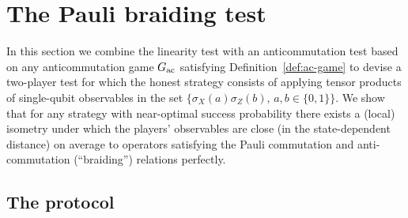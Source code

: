 \documentclass[11pt,letterpaper]{article}
\newcommand{\<}{\langle}
\renewcommand{\>}{\rangle}
\newcommand{\ac}{{\ensuremath{\rm ac}}}
\begin{document}
\section{The Pauli braiding test}
\label{sec:twoprover}


In this section we combine the linearity test with an anticommutation test based on any anticommutation game $G_\ac$ satisfying Definition~\ref{def:ac-game} to devise a
two-player test for which the honest strategy consists of applying
tensor products of single-qubit observables in the set $\{\sigma_X(a)\sigma_Z(b),\,a,b\in\{0,1\}\}$. We show that for any strategy with
near-optimal success probability there exists a (local) isometry under which
the players' observables are close (in the state-dependent distance) on average to operators satisfying the Pauli commutation and anti-commutation (``braiding'') relations perfectly. 

\subsection{The protocol}
\end{document}
